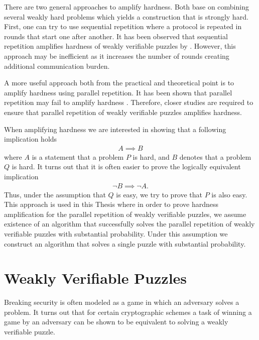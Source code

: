 \documentclass[11pt,a4paper,titlepage]{memoir}
\begin{document}
There are two general approaches to amplify hardness. Both base on combining several weakly hard problems which yields
a construction that is strongly hard. First, one can try to use sequential repetition where a protocol is repeated in rounds that start one after another.
It has been observed that sequential repetition amplifies hardness of weakly verifiable puzzles by \cite{von2003captcha}.
However, this approach may be inefficient as it increases the number of rounds creating additional communication burden.

A more useful approach both from the practical and theoretical point is to amplify hardness using parallel repetition.
It has been shown that parallel repetition may fail to amplify hardness \cite{bellare1997does}.
Therefore, closer studies are required to ensure that parallel repetition of weakly verifiable puzzles amplifies hardness.

When amplifying hardness we are interested in showing that a following implication holds
\begin{align*}
  A \implies B
\end{align*}
where $A$ is a statement that a problem $P$ is hard, and $B$ denotes that a problem $Q$ is hard.
It turns out that it is often easier to prove the logically equivalent implication
\begin{align*}
  \lnot B \implies \lnot A.
\end{align*}
Thus, under the assumption that $Q$ is easy, we try to prove that $P$ is also easy.
This approach is used in this Thesis where in order to prove hardness amplification for the parallel repetition of weakly verifiable puzzles,
we assume existence of an algorithm that successfully solves the parallel repetition of weakly verifiable puzzles with substantial probability.
Under this assumption we construct an algorithm that solves a single puzzle with substantial probability.

\section{Weakly Verifiable Puzzles}
Breaking security is often modeled as a game in which an adversary solves a problem.
It turns out that for certain cryptographic schemes a task of winning a game by an adversary
can be shown to be equivalent to solving a weakly verifiable puzzle.
\end{document}
